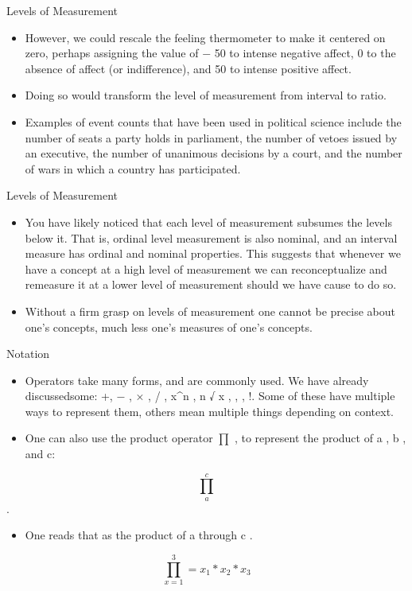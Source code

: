 \documentclass[
  ignorenonframetext,
]{beamer}
\providecommand{\tightlist}{%
  \setlength{\itemsep}{0pt}\setlength{\parskip}{0pt}}
\begin{document}
\begin{frame}{Levels of Measurement}
\protect\hypertarget{levels-of-measurement-2}{}

\begin{itemize}
\item
  However, we could rescale the feeling thermometer to make it centered
  on zero, perhaps assigning the value of − 50 to intense negative
  affect, 0 to the absence of affect (or indifference), and 50 to
  intense positive affect.
\item
  Doing so would transform the level of measurement from interval to
  ratio.
\item
  Examples of event counts that have been used in political science
  include the number of seats a party holds in parliament, the number of
  vetoes issued by an executive, the number of unanimous decisions by a
  court, and the number of wars in which a country has participated.
\end{itemize}

\end{frame}

\begin{frame}{Levels of Measurement}
\protect\hypertarget{levels-of-measurement-3}{}

\begin{itemize}
\item
  You have likely noticed that each level of measurement subsumes the
  levels below it. That is, ordinal level measurement is also nominal,
  and an interval measure has ordinal and nominal properties. This
  suggests that whenever we have a concept at a high level of
  measurement we can reconceptualize and remeasure it at a lower level
  of measurement should we have cause to do so.
\item
  Without a firm grasp on levels of measurement one cannot be precise
  about one's concepts, much less one's measures of one's concepts.
\end{itemize}

\end{frame}

\begin{frame}{Notation}
\protect\hypertarget{notation}{}

\begin{itemize}
\item
  Operators take many forms, and are commonly used. We have already
  discussedsome: +, − , × , / , x\^{}n , n √ x , , , !. Some of these
  have multiple ways to represent them, others mean multiple things
  depending on context.
\item
  One can also use the product operator \(\prod\) , to represent the
  product of a , b , and c:
\end{itemize}

\[\prod_{a}^{c}\].

\begin{itemize}
\tightlist
\item
  One reads that as the product of a through c .
\end{itemize}

\[\prod_{x = 1}^{3} = x_{1}*x_{2}*x_{3} \]

\end{frame}
\end{document}
